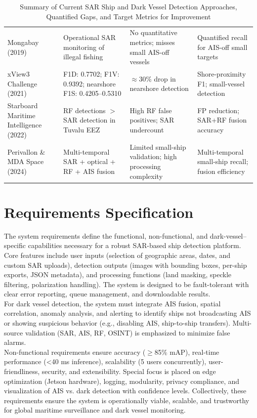 \documentclass{article}
\begin{document}
\begin{table}[h!]
\begin{tabularx}{\textwidth}{@{}p{2.7cm}X X X@{}}
			\raggedright Mongabay (2019) & Operational SAR monitoring of illegal fishing & No quantitative metrics; misses small AIS-off vessels & Quantified recall for AIS-off small targets \\
			\raggedright xView3 Challenge (2021) & F1D: 0.7702; F1V: 0.9392; nearshore F1S: 0.4205--0.5310 & $\approx$30\% drop in nearshore detection & Shore-proximity F1; small-vessel detection \\
			\raggedright Starboard Maritime Intelligence (2022) & RF detections $>$ SAR detection in Tuvalu EEZ & High RF false positives; SAR undercount & FP reduction; SAR+RF fusion accuracy \\
			\raggedright Perivallon \& MDA Space (2024) & Multi-temporal SAR + optical + RF + AIS fusion & Limited small-ship validation; high processing complexity & Multi-temporal small-ship recall; fusion efficiency \\
			\bottomrule
		\end{tabularx}
		\caption{Summary of Current SAR Ship and Dark Vessel Detection Approaches, Quantified Gaps, and Target Metrics for Improvement}
		\label{tab:sar_dark_vessel_review}
	\end{table}
	

	
	\newpage
	
	\section{Requirements Specification}
	The system requirements define the functional, non-functional, and dark-vessel–specific capabilities necessary for a robust SAR-based ship detection platform. Core features include user inputs (selection of geographic areas, dates, and custom SAR uploads), detection outputs (images with bounding boxes, per-ship exports, JSON metadata), and processing functions (land masking, speckle filtering, polarization handling). The system is designed to be fault-tolerant with clear error reporting, queue management, and downloadable results.\\
	
	For dark vessel detection, the system must integrate AIS fusion, spatial correlation, anomaly analysis, and alerting to identify ships not broadcasting AIS or showing suspicious behavior (e.g., disabling AIS, ship-to-ship transfers). Multi-source validation (SAR, AIS, RF, OSINT) is emphasized to minimize false alarms.\\
	
	Non-functional requirements ensure accuracy ($\geq$85\% mAP), real-time performance (<40 ms inference), scalability (5 users concurrently), user-friendliness, security, and extensibility. Special focus is placed on edge optimization (Jetson hardware), logging, modularity, privacy compliance, and visualization of AIS vs. dark detection with confidence levels. Collectively, these requirements ensure the system is operationally viable, scalable, and trustworthy for global maritime surveillance and dark vessel monitoring.
	
\end{document}
